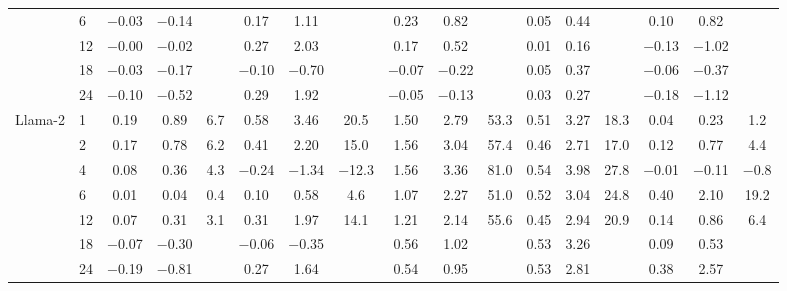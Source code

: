 \begin{table}[htbp]
{\begin{adjustbox}{max width=\linewidth, max totalheight=0.20\textheight}
\begin{tabular}{llccccccccccccccc}
 & 6 & $-$0.03 & $-$0.14 &  & \phantom{$-$}0.17 & \phantom{$-$}1.11 &  & \phantom{$-$}0.23 & \phantom{$-$}0.82 &  & 0.05 & 0.44 &  & \phantom{$-$}0.10 & \phantom{$-$}0.82 &  \\
 & 12 & $-$0.00 & $-$0.02 &  & \phantom{$-$}0.27 & \phantom{$-$}2.03 &  & \phantom{$-$}0.17 & \phantom{$-$}0.52 &  & 0.01 & 0.16 &  & $-$0.13 & $-$1.02 &  \\
 & 18 & $-$0.03 & $-$0.17 &  & $-$0.10 & $-$0.70 &  & $-$0.07 & $-$0.22 &  & 0.05 & 0.37 &  & $-$0.06 & $-$0.37 &  \\
 & 24 & $-$0.10 & $-$0.52 &  & \phantom{$-$}0.29 & \phantom{$-$}1.92 &  & $-$0.05 & $-$0.13 &  & 0.03 & 0.27 &  & $-$0.18 & $-$1.12 &  \\
\midrule
Llama-2 & 1 & \phantom{$-$}0.19 & \phantom{$-$}0.89 & 6.7 & \phantom{$-$}0.58 & \phantom{$-$}3.46 & \phantom{$-$}20.5 & \phantom{$-$}1.50 & \phantom{$-$}2.79 & 53.3 & 0.51 & 3.27 & 18.3 & \phantom{$-$}0.04 & \phantom{$-$}0.23 & \phantom{$-$0}1.2 \\
 & 2 & \phantom{$-$}0.17 & \phantom{$-$}0.78 & 6.2 & \phantom{$-$}0.41 & \phantom{$-$}2.20 & \phantom{$-$}15.0 & \phantom{$-$}1.56 & \phantom{$-$}3.04 & 57.4 & 0.46 & 2.71 & 17.0 & \phantom{$-$}0.12 & \phantom{$-$}0.77 & \phantom{$-$0}4.4 \\
 & 4 & \phantom{$-$}0.08 & \phantom{$-$}0.36 & 4.3 & $-$0.24 & $-$1.34 & $-$12.3 & \phantom{$-$}1.56 & \phantom{$-$}3.36 & 81.0 & 0.54 & 3.98 & 27.8 & $-$0.01 & $-$0.11 & \phantom{0}$-$0.8 \\
 & 6 & \phantom{$-$}0.01 & \phantom{$-$}0.04 & 0.4 & \phantom{$-$}0.10 & \phantom{$-$}0.58 & \phantom{$-$0}4.6 & \phantom{$-$}1.07 & \phantom{$-$}2.27 & 51.0 & 0.52 & 3.04 & 24.8 & \phantom{$-$}0.40 & \phantom{$-$}2.10 & \phantom{$-$}19.2 \\
 & 12 & \phantom{$-$}0.07 & \phantom{$-$}0.31 & 3.1 & \phantom{$-$}0.31 & \phantom{$-$}1.97 & \phantom{$-$}14.1 & \phantom{$-$}1.21 & \phantom{$-$}2.14 & 55.6 & 0.45 & 2.94 & 20.9 & \phantom{$-$}0.14 & \phantom{$-$}0.86 & \phantom{$-$0}6.4 \\
 & 18 & $-$0.07 & $-$0.30 &  & $-$0.06 & $-$0.35 &  & \phantom{$-$}0.56 & \phantom{$-$}1.02 &  & 0.53 & 3.26 &  & \phantom{$-$}0.09 & \phantom{$-$}0.53 &  \\
 & 24 & $-$0.19 & $-$0.81 &  & \phantom{$-$}0.27 & \phantom{$-$}1.64 &  & \phantom{$-$}0.54 & \phantom{$-$}0.95 &  & 0.53 & 2.81 &  & \phantom{$-$}0.38 & \phantom{$-$}2.57 &  \\
\bottomrule
\end{tabular}

\end{adjustbox}}
\end{table}
